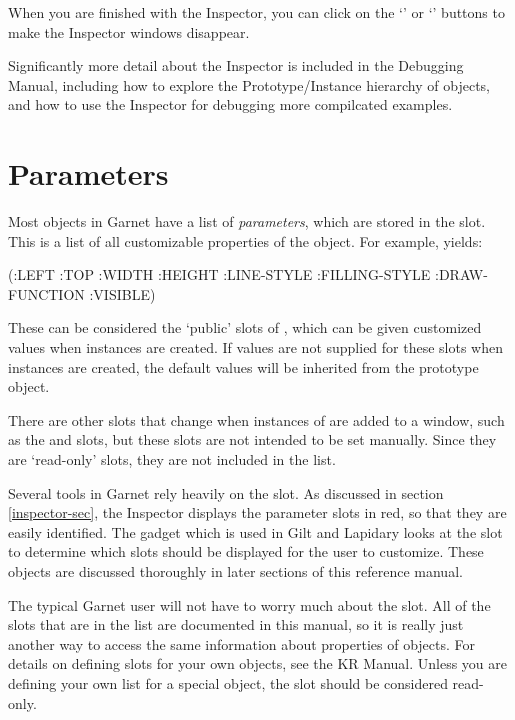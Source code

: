 When you are finished with the Inspector, you can click on the `' or
`' buttons to make the Inspector windows disappear.

Significantly more detail about the Inspector is included in the Debugging
Manual, including how to explore the Prototype/Instance hierarchy of objects,
and how to use the Inspector for debugging more compilcated examples.


\section{Parameters}
\label{parameters}

Most objects in Garnet have a list of {\it parameters}, which are stored in the
 slot.  This is a list of all customizable properties of
the object.  For example,  yields:

\begin{programexample}
(:LEFT :TOP :WIDTH :HEIGHT :LINE-STYLE :FILLING-STYLE :DRAW-FUNCTION :VISIBLE)
\end{programexample}

These can be considered the `public' slots of , which can
be given customized values when instances are created.  If values are not
supplied for these slots when instances are created, the default values will
be inherited from the prototype object.

There are other slots that change when instances of  are
added to a window, such as the  and  slots, but these
slots are not intended to be set manually.  Since they are `read-only' slots,
they are not included in the  list.

Several tools in Garnet rely heavily on the  slot.
As discussed in section \ref{inspector-sec}, the Inspector displays the
parameter slots in red, so that they are easily identified.  The
 gadget which is used in Gilt and Lapidary looks at the
 slot to determine which slots should be displayed for the
user to customize.  These objects are discussed thoroughly in later sections
of this reference manual.

The typical Garnet user will not have to worry much about the 
slot.  All of the slots that are in the list are documented in this manual,
so it is really just another way to access the same information about
properties of objects.  For details on defining  slots for
your own objects, see the KR Manual.  Unless you are defining your own
list for a special object, the  slot should be considered
read-only.


